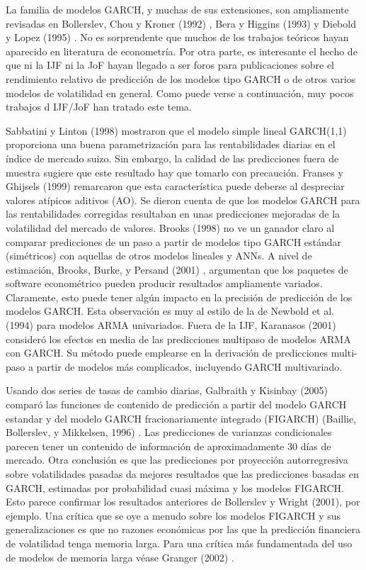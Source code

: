 \documentclass{llncs}
\begin{document}
La familia de modelos GARCH, y muchas de sus extensiones, son ampliamente revisadas en Bollerslev, Chou y Kroner (1992)  \cite{Bollerslev19925}, Bera y Higgins (1993) \cite{Bera1993305} y Diebold y Lopez (1995) \cite{Diebold1995253}. No es sorprendente que muchos de los trabajos teóricos hayan aparecido en literatura de econometría. Por otra parte, es interesante el hecho de que ni la IJF ni la JoF hayan llegado a ser foros para publicaciones sobre el rendimiento relativo de predicción de los modelos tipo GARCH o de otros varios modelos de volatilidad en general. Como puede verse a continuación, muy pocos trabajos d IJF/JoF han tratado este tema.

Sabbatini y Linton (1998) mostraron que el modelo simple lineal GARCH(1,1) proporciona una buena parametrización para las rentabilidades diarias en el índice de mercado suizo. Sin embargo, la calidad de las predicciones fuera de muestra sugiere que este resultado hay que tomarlo con precaución. Franses y Ghijsels (1999) \cite{Franses19991} remarcaron que esta característica puede deberse al despreciar valores atípicos aditivos (AO). Se dieron cuenta de que los modelos GARCH para las rentabilidades corregidas resultaban en unas predicciones mejoradas de la volatilidad del mercado de valores. Brooks (1998) \cite{Brooks199859} no ve un ganador claro al comparar predicciones de un paso a partir de modelos tipo GARCH estándar (simétricos) con aquellas de otros modelos lineales y ANNs. A nivel de estimación, Brooks, Burke, y Persand (2001) \cite{Brooks200145}, argumentan que los paquetes de software econométrico pueden producir resultados ampliamente variados. Claramente, esto puede tener algún impacto en la precisión de predicción de los modelos GARCH. Esta observación es muy al estilo de la de Newbold et al. (1994) \cite{Newbold1994573} para modelos ARMA univariados. Fuera de la IJF, Karanasos (2001) \cite{Karanasos2001555} consideró los efectos en media de las predicciones multipaso de modelos ARMA con GARCH. Su método puede emplearse en la derivación de predicciones multi-paso a partir de modelos más complicados, incluyendo GARCH multivariado.

Usando dos series de tasas de cambio diarias, Galbraith y Kisinbay (2005) comparó las funciones de contenido de predicción a partir del modelo GARCH estandar y del modelo GARCH fracionariamente integrado (FIGARCH) (Baillie, Bollerslev, y Mikkelsen, 1996) \cite{Baillie19963}. Las predicciones de varianzas condicionales parecen tener un contenido de información de aproximadamente 30 días de mercado. Otra conclusión es que las predicciones por proyección autorregresiva sobre volatilidades pasadas da mejores resultados que las predicciones basadas en GARCH, estimadas por probabilidad cuasi máxima y los modelos FIGARCH. Esto parece confirmar los resultados anteriores de Bollerslev y Wright (2001), por ejemplo. Una crítica que se oye a menudo sobre los modelos FIGARCH y sus generalizaciones es que no razones económicas por las que la predicción financiera de volatilidad tenga memoria larga. Para una crítica más fundamentada del uso de modelos de memoria larga véase Granger (2002) \cite{Granger2002}.
\end{document}
